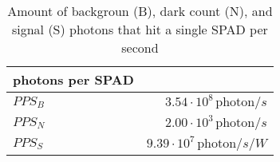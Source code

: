 \begin{table}[H]
\centering
\caption{Amount of backgroun (B), dark count (N), and signal (S) photons that hit a single SPAD per second}
\label{tab:photons_per_SPAD}
\begin{tabular}{|l|r|}\hline
    \textbf{photons per SPAD} & \\
    \hline 
    $PPS_B$ & $3.54\cdot10^{8}\, \text{photon}/s$ \\
    $PPS_N$ & $2.00\cdot10^{3}\, \text{photon}/s$ \\
    $PPS_S$ & $9.39\cdot10^{7}\, \text{photon}/s/W$ \\
    \hline 
\end{tabular}
\end{table}
